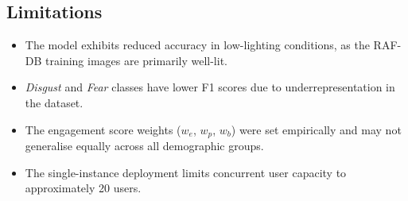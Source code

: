 \subsection{Limitations}

\begin{itemize}
    \item The model exhibits reduced accuracy in low-lighting conditions,
          as the RAF-DB training images are primarily well-lit.
    \item \textit{Disgust} and \textit{Fear} classes have lower F1 scores
          due to underrepresentation in the dataset.
    \item The engagement score weights ($w_e$, $w_p$, $w_b$) were set
          empirically and may not generalise equally across all demographic
          groups.
    \item The single-instance deployment limits concurrent user capacity
          to approximately 20 users.
\end{itemize}
